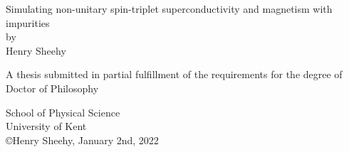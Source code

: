 \begin{titlepage}
\begin{center}
  \large

  \hfill
  \vfill

  Simulating non-unitary spin-triplet superconductivity and magnetism with impurities\\ \bigskip
  by\\ \bigskip
  Henry Sheehy

  \vfill

  A thesis submitted in partial fulfillment of the requirements for the degree
  of\\ \bigskip
  Doctor of Philosophy \\

  \vfill

  School of Physical Science\\
  University of Kent\\

  \vfill
  \vspace*{1cm}
  \copyright Henry Sheehy, January 2nd, 2022
\end{center}  
\end{titlepage}   

